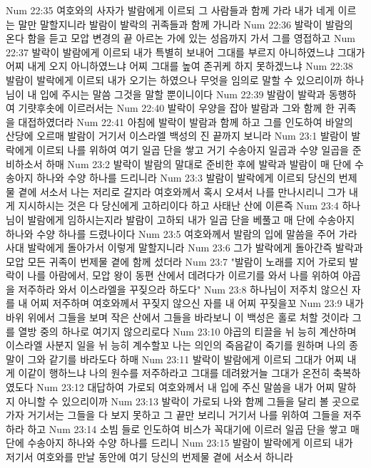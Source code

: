 Num 22:35  여호와의 사자가 발람에게 이르되 그 사람들과 함께 가라 내가 네게 이르는 말만 말할지니라 발람이 발락의 귀족들과 함께 가니라
Num 22:36  발락이 발람의 온다 함을 듣고 모압 변경의 끝 아르논 가에 있는 성읍까지 가서 그를 영접하고
Num 22:37  발락이 발람에게 이르되 내가 특별히 보내어 그대를 부르지 아니하였느냐 그대가 어찌 내게 오지 아니하였느냐 어찌 그대를 높여 존귀케 하지 못하겠느냐
Num 22:38  발람이 발락에게 이르되 내가 오기는 하였으나 무엇을 임의로 말할 수 있으리이까 하나님이 내 입에 주시는 말씀 그것을 말할 뿐이니이다
Num 22:39  발람이 발락과 동행하여 기럇후솟에 이르러서는
Num 22:40  발락이 우양을 잡아 발람과 그와 함께 한 귀족을 대접하였더라
Num 22:41  아침에 발락이 발람과 함께 하고 그를 인도하여 바알의 산당에 오르매 발람이 거기서 이스라엘 백성의 진 끝까지 보니라
Num 23:1  발람이 발락에게 이르되 나를 위하여 여기 일곱 단을 쌓고 거기 수송아지 일곱과 수양 일곱을 준비하소서 하매
Num 23:2  발락이 발람의 말대로 준비한 후에 발락과 발람이 매 단에 수송아지 하나와 수양 하나를 드리니라
Num 23:3  발람이 발락에게 이르되 당신의 번제물 곁에 서소서 나는 저리로 갈지라 여호와께서 혹시 오셔서 나를 만나시리니 그가 내게 지시하시는 것은 다 당신에게 고하리이다 하고 사태난 산에 이른즉
Num 23:4  하나님이 발람에게 임하시는지라 발람이 고하되 내가 일곱 단을 베풀고 매 단에 수송아지 하나와 수양 하나를 드렸나이다
Num 23:5  여호와께서 발람의 입에 말씀을 주어 가라사대 발락에게 돌아가서 이렇게 말할지니라
Num 23:6  그가 발락에게 돌아간즉 발락과 모압 모든 귀족이 번제물 곁에 함께 섰더라
Num 23:7  "발람이 노래를 지어 가로되 발락이 나를 아람에서, 모압 왕이 동편 산에서 데려다가 이르기를 와서 나를 위하여 야곱을 저주하라 와서 이스라엘을 꾸짖으라 하도다"
Num 23:8  하나님이 저주치 않으신 자를 내 어찌 저주하며 여호와께서 꾸짖지 않으신 자를 내 어찌 꾸짖을꼬
Num 23:9  내가 바위 위에서 그들을 보며 작은 산에서 그들을 바라보니 이 백성은 홀로 처할 것이라 그를 열방 중의 하나로 여기지 않으리로다
Num 23:10  야곱의 티끌을 뉘 능히 계산하며 이스라엘 사분지 일을 뉘 능히 계수할꼬 나는 의인의 죽음같이 죽기를 원하며 나의 종말이 그와 같기를 바라도다 하매
Num 23:11  발락이 발람에게 이르되 그대가 어찌 내게 이같이 행하느냐 나의 원수를 저주하라고 그대를 데려왔거늘 그대가 온전히 축복하였도다
Num 23:12  대답하여 가로되 여호와께서 내 입에 주신 말씀을 내가 어찌 말하지 아니할 수 있으리이까
Num 23:13  발락이 가로되 나와 함께 그들을 달리 볼 곳으로 가자 거기서는 그들을 다 보지 못하고 그 끝만 보리니 거기서 나를 위하여 그들을 저주하라 하고
Num 23:14  소빔 들로 인도하여 비스가 꼭대기에 이르러 일곱 단을 쌓고 매 단에 수송아지 하나와 수양 하나를 드리니
Num 23:15  발람이 발락에게 이르되 내가 저기서 여호와를 만날 동안에 여기 당신의 번제물 곁에 서소서 하니라
